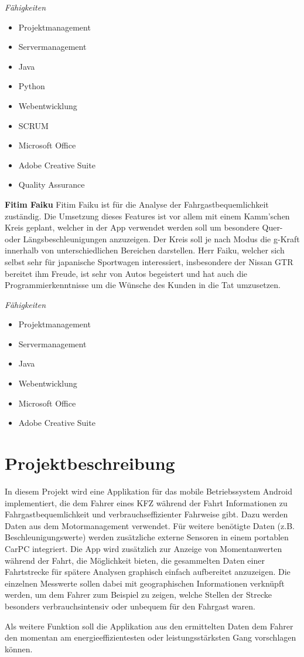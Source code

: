 \textit{Fähigkeiten}
\begin{itemize}
	\item Projektmanagement
	\item Servermanagement				
	\item Java
	\item Python
	\item Webentwicklung
	\item SCRUM
	\item Microsoft Office
	\item Adobe Creative Suite
	\item Quality Assurance
\end{itemize}

\textbf{Fitim Faiku}
Fitim Faiku ist für die Analyse der Fahrgastbequemlichkeit zuständig. Die Umsetzung dieses Features ist vor allem mit einem Kamm'schen Kreis geplant, welcher in der App verwendet werden soll um besondere Quer- oder Längsbeschleunigungen anzuzeigen. Der Kreis soll je nach Modus die g-Kraft innerhalb von unterschiedlichen Bereichen darstellen. 
Herr Faiku, welcher sich selbst sehr für japanische Sportwagen interessiert, insbesondere der Nissan GTR bereitet ihm Freude, ist sehr von Autos begeistert und hat auch die Programmierkenntnisse um die Wünsche des Kunden in die Tat umzusetzen. 

\textit{Fähigkeiten}
\begin{itemize}
	\item Projektmanagement
	\item Servermanagement				
	\item Java
	\item Webentwicklung
	\item Microsoft Office
	\item Adobe Creative Suite
\end{itemize}

\section{Projektbeschreibung}
In diesem Projekt wird eine Applikation für das mobile Betriebssystem Android implementiert, die dem Fahrer eines KFZ während der Fahrt Informationen zu Fahrgastbequemlichkeit und verbrauchseffizienter Fahrweise gibt. Dazu werden Daten aus dem Motormanagement verwendet. Für weitere benötigte Daten (z.B. Beschleunigungswerte) werden zusätzliche externe Sensoren in einem portablen CarPC integriert. Die App wird zusätzlich zur Anzeige von Momentanwerten während der Fahrt, die Möglichkeit bieten, die gesammelten Daten einer Fahrtstrecke für spätere Analysen graphisch einfach aufbereitet anzuzeigen. Die einzelnen Messwerte sollen dabei mit geographischen Informationen verknüpft werden, um dem Fahrer zum Beispiel zu zeigen, welche Stellen der Strecke besonders verbrauchsintensiv oder unbequem für den Fahrgast waren. 

Als weitere Funktion soll die Applikation aus den ermittelten Daten dem Fahrer den momentan am energieeffizientesten oder leistungsstärksten Gang vorschlagen können.
